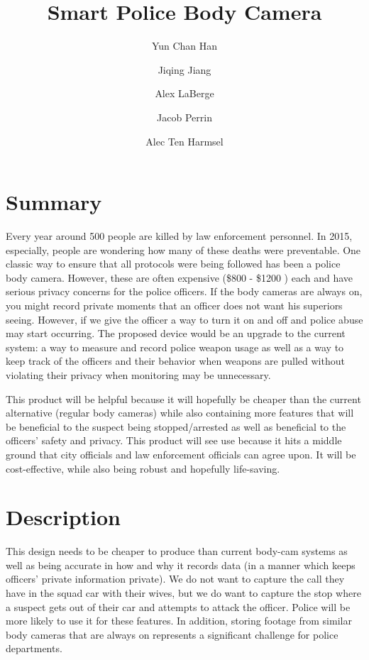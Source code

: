 \documentclass[12pt]{article}
\begin{document}
\setcounter{secnumdepth}{0}

\title{Smart Police Body Camera}
\author{
    Yun Chan Han \and
    Jiqing Jiang \and
    Alex LaBerge \and
    Jacob Perrin \and
    Alec Ten Harmsel
}
\date{}
\maketitle

\newpage


\section{Summary}
Every year around 500 people are killed by law enforcement personnel. In 2015,
especially, people are wondering how many of these deaths were preventable. One
classic way to ensure that all protocols were being followed has been a police
body camera. However, these are often expensive (\$800 - \$1200 \cite{cam})
each and have serious privacy concerns for the police officers. If the body
cameras are always on, you might record private moments that an officer does
not want his superiors seeing. However, if we give the officer a way to turn it
on and off and police abuse may start occurring. The proposed device would be
an upgrade to the current system: a way to measure and record police weapon
usage as well as a way to keep track of the officers and their behavior when
weapons are pulled without violating their privacy when monitoring may be
unnecessary.

This product will be helpful because it will hopefully be cheaper than the
current alternative (regular body cameras) while also containing more features
that will be beneficial to the suspect being stopped/arrested as well as
beneficial to the officers' safety and privacy. This product will see use
because it hits a middle ground that city officials and law enforcement
officials can agree upon. It will be cost-effective, while also being robust
and hopefully life-saving.

\section{Description}

This design needs to be cheaper to produce than current body-cam systems as
well as being accurate in how and why it records data (in a manner which keeps
officers' private information private). We do not want to capture the call they
have in the squad car with their wives, but we do want to capture the stop
where a suspect gets out of their car and attempts to attack the officer.
Police will be more likely to use it for these features. In addition, storing
footage from similar body cameras that are always on represents a significant
challenge for police departments\cite{store1,store2}.
\end{document}

